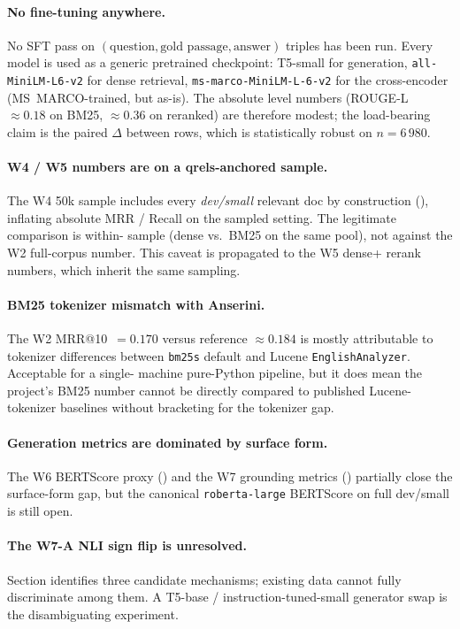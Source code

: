 \documentclass[11pt,a4paper]{article}
\makeatletter
\newcommand{\devsmall}{\textit{dev/small}}
\newcommand{\fdev}{6\,980}
\newcommand{\msmarco}{MS~MARCO}
\newcommand{\rougel}{ROUGE-L}
\newcommand{\bertscore}{BERTScore}
\newcommand{\mrr}{MRR@10}
\newcommand{\bmtwofive}{BM25}
\makeatother
\begin{document}
\paragraph{No fine-tuning anywhere.}  No SFT pass on
$(\text{question}, \text{gold passage}, \text{answer})$ triples has
been run.  Every model is used as a generic pretrained checkpoint:
T5-small for generation, \texttt{all-MiniLM-L6-v2} for dense
retrieval, \texttt{ms-marco-MiniLM-L-6-v2} for the cross-encoder
(\msmarco{}-trained, but as-is).  The absolute level numbers
(\rougel{}~$\approx\!0.18$ on \bmtwofive{}, $\approx\!0.36$ on
reranked) are therefore modest; the load-bearing claim is the
paired $\Delta$ between rows, which is statistically robust on
$n\!=\!\fdev{}$.

\paragraph{W4 / W5 numbers are on a qrels-anchored sample.}  The W4
50k sample includes every \devsmall{} relevant doc by construction
(), inflating absolute MRR / Recall
on the sampled setting.  The legitimate comparison is within-
sample (dense vs.\ \bmtwofive{} on the same pool), not against the
W2 full-corpus number.  This caveat is propagated to the W5 dense+
rerank numbers, which inherit the same sampling.

\paragraph{\bmtwofive{} tokenizer mismatch with Anserini.}  The W2
\mrr{}~$=0.170$ versus reference $\approx 0.184$ is mostly
attributable to tokenizer differences between \texttt{bm25s} default
and Lucene \texttt{EnglishAnalyzer}.  Acceptable for a single-
machine pure-Python pipeline, but it does mean the project's
\bmtwofive{} number cannot be directly compared to published
Lucene-tokenizer baselines without bracketing for the tokenizer gap.

\paragraph{Generation metrics are dominated by surface form.}  The
W6 \bertscore{} proxy () and the W7
grounding metrics () partially close the surface-form
gap, but the canonical \texttt{roberta-large} \bertscore{} on full
dev/small is still open.

\paragraph{The W7-A NLI sign flip is unresolved.}  Section
 identifies three candidate
mechanisms; existing data cannot fully discriminate among them.
A T5-base / instruction-tuned-small generator swap is the
disambiguating experiment.
\end{document}
